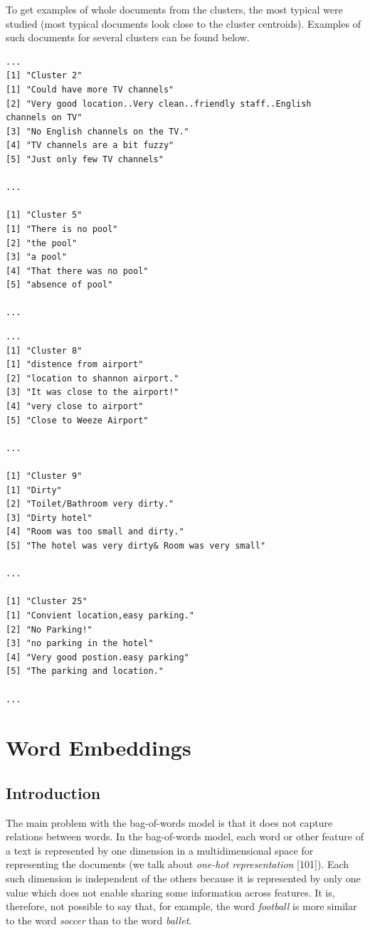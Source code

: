 \documentclass[11pt,openany,executivepaper]{book}
\begin{document}
To get examples of whole documents from the clusters, the most typical were studied (most typical documents look close to the cluster centroids). Examples of such documents for several clusters can be found below.

\begin{verbatim}
...
[1] "Cluster 2"
[1] "Could have more TV channels"
[2] "Very good location..Very clean..friendly staff..English 
channels on TV"
[3] "No English channels on the TV."
[4] "TV channels are a bit fuzzy"
[5] "Just only few TV channels"

...

[1] "Cluster 5"
[1] "There is no pool"
[2] "the pool"
[3] "a pool"
[4] "That there was no pool"
[5] "absence of pool"

...
\end{verbatim}

\begin{verbatim}
...
[1] "Cluster 8"
[1] "distence from airport"
[2] "location to shannon airport."
[3] "It was close to the airport!"
[4] "very close to airport"
[5] "Close to Weeze Airport"

...

[1] "Cluster 9"
[1] "Dirty"
[2] "Toilet/Bathroom very dirty."
[3] "Dirty hotel"
[4] "Room was too small and dirty."
[5] "The hotel was very dirty& Room was very small"

...

[1] "Cluster 25"
[1] "Convient location,easy parking."
[2] "No Parking!"
[3] "no parking in the hotel"
[4] "Very good postion.easy parking"
[5] "The parking and location."

...
\end{verbatim}


\chapter{Word Embeddings}%

\section{Introduction}
The main problem with the bag-of-words model is that it does not capture relations between words. In the bag-of-words model, each word or other feature of a text is represented by one dimension in a multidimensional space for representing the documents (we talk about \textit{one-hot representation} [101]). Each such dimension is independent of the others because it is represented by only one value which does not enable sharing some information across features. It is, therefore, not possible to say that, for example, the word \textit{football} is more similar to the word \textit{soccer} than to the word \textit{ballet}.
\end{document}
